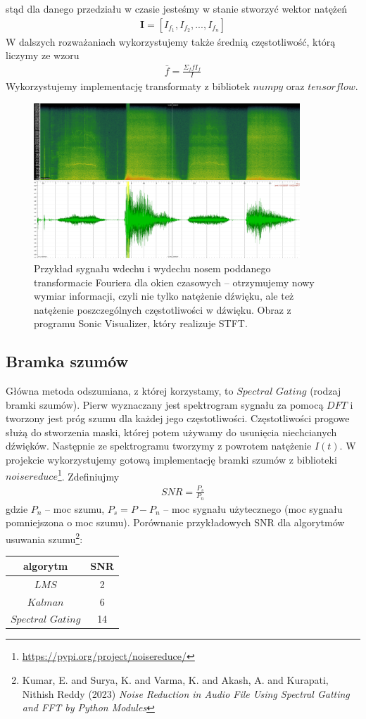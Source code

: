 \documentclass[polish]{article}
\begin{document}
stąd dla danego przedziału w czasie jesteśmy w stanie stworzyć wektor natężeń
\begin{gather*}
	\boldsymbol{I} = [I_{f_1}, I_{f_2}, ..., I_{f_n}]
\end{gather*}
W dalszych rozważaniach wykorzystujemy także średnią częstotliwość, którą liczymy ze wzoru
\begin{gather*}
	\bar{f} = \frac{\Sigma_ffI_f}{I}
\end{gather*}
Wykorzystujemy implementację transformaty z bibliotek $numpy$ oraz $tensorflow$.
\begin{figure}[H]
	\centering
	\includegraphics[width=10cm]{stft2}
	\caption{Przykład sygnału wdechu i wydechu nosem poddanego transformacie Fouriera dla okien czasowych -- otrzymujemy nowy wymiar informacji, czyli nie tylko natężenie
dźwięku, ale też natężenie poszczególnych częstotliwości w dźwięku. Obraz z programu Sonic Visualizer, który realizuje STFT.}
\end{figure}

\subsection{Bramka szumów}
Główna metoda odszumiana, z której korzystamy, to $Spectral$ $Gating$ (rodzaj bramki szumów). Pierw wyznaczany jest spektrogram sygnału za pomocą $DFT$ i 
tworzony jest próg szumu dla każdej jego częstotliwości.
Częstotliwości progowe służą do stworzenia maski, której potem używamy do usunięcia niechcianych dźwięków.
Następnie ze spektrogramu tworzymy z powrotem natężenie $I(t)$. W projekcie wykorzystujemy gotową implementację bramki szumów z biblioteki $noisereduce$\footnote{\url{https://pypi.org/project/noisereduce/}}. Zdefiniujmy
\begin{gather*}
	SNR = \frac{P_s}{P_n}
\end{gather*}
gdzie $P_n$ -- moc szumu, $P_s = P - P_n$ -- moc sygnału użytecznego (moc sygnału pomniejszona o moc szumu).
Porównanie przykładowych SNR dla algorytmów usuwania szumu\footnote{Kumar, E. and Surya, K. and Varma, K. and Akash, A. and Kurapati, Nithish Reddy (2023) \emph{Noise Reduction in Audio File Using Spectral Gatting and FFT by Python Modules}}:
\begin{center}
\begin{tabular}{c  | c }
algorytm & SNR \\
\hline
$LMS$ & 2 \\
$Kalman$ & 6 \\
$Spectral$ $Gating$ & 14
\end{tabular}
\end{center}
\end{document}
